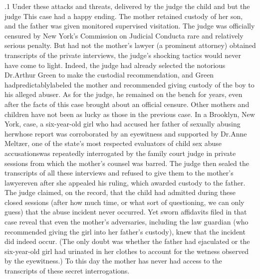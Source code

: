 \documentclass[11pt, twoside]{article}
\begin{document}
{\p.1{%
Under these attacks and threats, delivered by the judge  the child  and  but the judge 
This case had a happy ending. The mother retained custody of her son,
and the father was given monitored supervised visitation. The judge was
officially censured by New York’s Commission on Judicial
Conduct\mdash{}a rare and relatively serious penalty. But had not the mother’s lawyer
(a prominent attorney) obtained transcripts of the private interviews,
the judge’s shocking tactics would never have come to light. Indeed,
the judge had already selected the notorious Dr.\@ Arthur Green to make the
custodial recommendation, and Green had\mdash{}predictably\mdash{}labeled the
mother  and recommended giving custody of the boy to his
alleged abuser. As for the judge, he remained on the bench for years,
even after the facts of this case brought about an official censure.
Other mothers and children have not been as lucky as those in the
previous case. In a Brooklyn, New York, case, a six-year-old girl who
had accused her father of sexually abusing her\mdash{}whose report was corroborated by an eyewitness and supported by Dr.\@ Anne Meltzer, one
of the state’s most respected evaluators of child sex abuse
accusations\mdash{}was repeatedly interrogated by the family court judge in private sessions
from which the mother’s counsel was barred. The judge then sealed
the transcripts of all these interviews and refused to give them to the
mother’s lawyer\mdash{}even after she appealed his ruling, which awarded custody to the father. The judge claimed, on the record, that the child had
admitted during these closed sessions (after how much time, or what
sort of questioning, we can only guess) that the abuse incident never
occurred. Yet sworn affidavits filed in that case reveal that even the
mother’s adversaries, including the law guardian (who recommended
giving the girl into her father’s custody), knew that the incident did indeed occur. (The only doubt was whether the father had ejaculated or
the six-year-old girl had urinated in her clothes to account for the wetness observed by the eyewitness.) To this day the mother has never had
access to the transcripts of these secret interrogations.
}%

}
\end{document}
